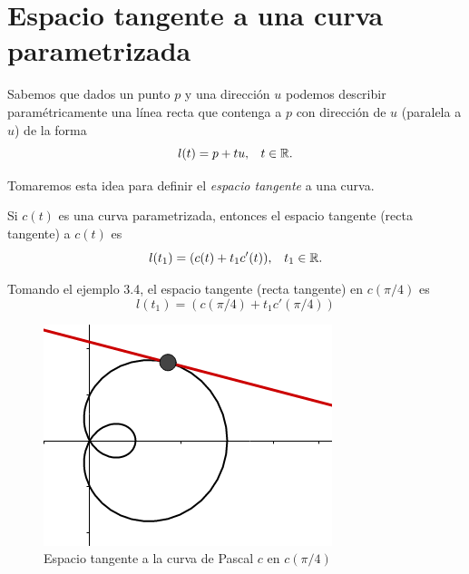 \section{Espacio tangente a una curva parametrizada}

Sabemos que dados un punto $p$ y una direcci\'on $u$ podemos describir param\'etricamente una
l\'inea recta que contenga a $p$ con direcci\'on de $u$ (paralela a $u$) de la forma
$$ l(t) = p + tu \text{,} \quad t \in \mathbb{R} \text{.}$$

Tomaremos esta idea para definir el \emph{espacio tangente} a una curva.

\begin{definition}
    Si $c(t)$ es una curva parametrizada, entonces el espacio tangente (recta tangente) a $c(t)$ es
    $$ l(t_{1}) = ( c(t) + t_{1}c'(t) ) \text{,} \quad t_{1} \in \mathbb{R} \text{.}$$
\end{definition}

\begin{myExample}
    Tomando el ejemplo 3.4, el espacio tangente (recta tangente) en $c(\pi/4)$ es
    $$ l(t_{1}) = (c(\pi/4) + t_{1}c'(\pi/4)) $$
\end{myExample}

\begin{figure}[!ht]
  \begin{center}
      \includegraphics[width=0.8\linewidth]{gfx/limacon}
      \caption{Espacio tangente a la curva de Pascal $c$ en $c(\pi/4)$}
      \label{fig:boat1}
  \end{center}
\end{figure}


